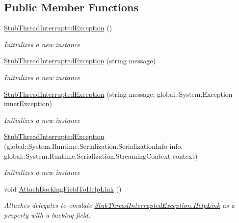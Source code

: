 \subsection*{Public Member Functions}
\begin{DoxyCompactItemize}
\item 
\hyperlink{class_system_1_1_threading_1_1_fakes_1_1_stub_thread_interrupted_exception_af9f371f755dc673489d2d74fadf53ea7}{Stub\-Thread\-Interrupted\-Exception} ()
\begin{DoxyCompactList}\small\item\em Initializes a new instance\end{DoxyCompactList}\item 
\hyperlink{class_system_1_1_threading_1_1_fakes_1_1_stub_thread_interrupted_exception_ac8a57d5e61057a1fc7948df7ad190707}{Stub\-Thread\-Interrupted\-Exception} (string message)
\begin{DoxyCompactList}\small\item\em Initializes a new instance\end{DoxyCompactList}\item 
\hyperlink{class_system_1_1_threading_1_1_fakes_1_1_stub_thread_interrupted_exception_affa86f36d224f18c44fbbfecad466441}{Stub\-Thread\-Interrupted\-Exception} (string message, global\-::\-System.\-Exception inner\-Exception)
\begin{DoxyCompactList}\small\item\em Initializes a new instance\end{DoxyCompactList}\item 
\hyperlink{class_system_1_1_threading_1_1_fakes_1_1_stub_thread_interrupted_exception_ad0df06b437d55c635fddd34f065369ae}{Stub\-Thread\-Interrupted\-Exception} (global\-::\-System.\-Runtime.\-Serialization.\-Serialization\-Info info, global\-::\-System.\-Runtime.\-Serialization.\-Streaming\-Context context)
\begin{DoxyCompactList}\small\item\em Initializes a new instance\end{DoxyCompactList}\item 
void \hyperlink{class_system_1_1_threading_1_1_fakes_1_1_stub_thread_interrupted_exception_ac628b13fe160ed11611b7a6da1569c38}{Attach\-Backing\-Field\-To\-Help\-Link} ()
\begin{DoxyCompactList}\small\item\em Attaches delegates to emulate \hyperlink{class_system_1_1_threading_1_1_fakes_1_1_stub_thread_interrupted_exception_ae664fb6a2d2a5507200176750b4f2cc1}{Stub\-Thread\-Interrupted\-Exception.\-Help\-Link} as a property with a backing field.\end{DoxyCompactList}\item 

\end{DoxyCompactItemize}
